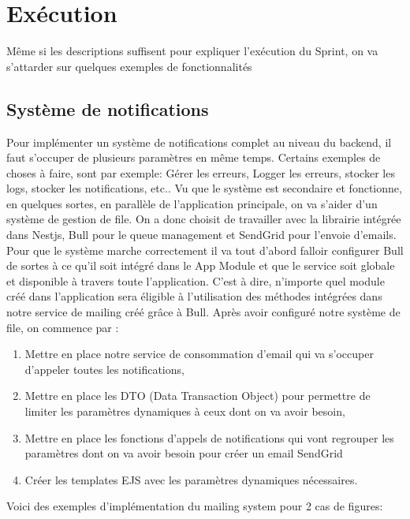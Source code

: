 \documentclass[../main.tex]{subfiles}
\begin{document}
\newpage
\section{Exécution}
Même si les descriptions suffisent pour expliquer l'exécution du Sprint, on va s'attarder sur quelques exemples de fonctionnalités

\subsection{Système de notifications}
Pour implémenter un système de notifications complet au niveau du backend, il faut s'occuper de plusieurs paramètres en même temps. Certains exemples de choses à faire, sont par exemple: Gérer les erreurs, Logger les erreurs, stocker les logs, stocker les notifications, etc.. 
\newline Vu que le système est secondaire et fonctionne, en quelques sortes, en parallèle de l'application principale, on va s'aider d'un système de gestion de file.
\newline On a donc choisit de travailler avec la librairie intégrée dans Nestjs, Bull pour le queue management et SendGrid pour l'envoie d'emails. 
\newline Pour que le système marche correctement il va tout d'abord falloir configurer Bull de sortes à ce qu'il soit intégré dans le App Module et que le service soit globale et disponible à travers toute l'application. C'est à dire, n'importe quel module créé dans l'application sera éligible à l'utilisation des méthodes intégrées dans notre service de mailing créé grâce à Bull.
\newline Après avoir configuré notre système de file, on commence par :
\begin{enumerate}
\item Mettre en place notre service de consommation d'email qui va s'occuper d'appeler toutes les notifications, 
\item Mettre en place les DTO (Data Transaction Object) pour permettre de limiter les paramètres dynamiques à ceux dont on va avoir besoin,
\item Mettre en place les fonctions d'appels de notifications qui vont regrouper les paramètres dont on va avoir besoin pour créer un email SendGrid
\item Créer les templates EJS avec les paramètres dynamiques nécessaires. 
\end{enumerate}
\vspace{5mm}
Voici des exemples d'implémentation du mailing system pour 2 cas de figures: 
\end{document}
